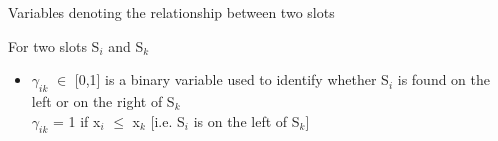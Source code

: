 \hfill \break
Variables denoting the relationship between two slots 

For two slots S$_i$ and S$_k$ 
\begin{itemize}
\item $\gamma_{ik}$ $\in$ [0,1] is a binary variable used to identify whether S$_i$ is found on the left or on the right of S$_k$\\
$\gamma_{ik}$ = 1 if x$_i$ $\leq$ x$_k$ [i.e. S$_i$ is on the left of S$_k$]

\begin{comment}
\item $\theta_{ik}$ $\in$ [0,1] is a binary variable used to identify whether S$_i$ is found on the top or bottom of of S$_k$\\
$\theta_{ik}$ = 1 if y$_i$ $\leq$ y$_k$ [i.e. S$_i$ is found below S$_k$]

\item $\Gamma_{ik}$ $\in$ [0,1] is used to denote if bottom right x coordinate of S$_i$ is found to the right of the bottom left coordinate of S$_k$ \\
$\Gamma$ = 1 if x$_i$ + w$_i$ $\geq$ x$_k$

\item $\eta_{ik}$ $\in$ [0,1] is used to denote if bottom right x coordinate of S$_k$ is found to the right of the bottom left coordinate of S$_i$ \\
$\eta$ = 1 if x$_k$ + w$_k$ $\geq$ x$_i$

\item $\Omega_{ik}$ $\in$ [0,1] is used to denote if the top y coordinate of S$_i$ is found above the lower y coordinate of S$_k$ \\
$\Omega$ = 1 if y$_i$ + h$_i$ $\geq$ y$_k$

\item $\Psi_{ik}$ $\in$ [0,1] is used to denote if top y coordinate of S$_k$ is found above the lower y coordinate of S$_i$ \\
$\Psi$ = 1 if y$_k$ + h$_k$ $\geq$ y$_i$


\item $\Delta_{ik}$ $\in$ [0,1] is a binary variable which indicates interfernce between slots S$_i$ and S$_k$.\\
$\Delta_{ik}$ = 0 if there is no interference between the slots [i.e. not a single tile is shared between slots]

\end{comment}
\end{itemize}

